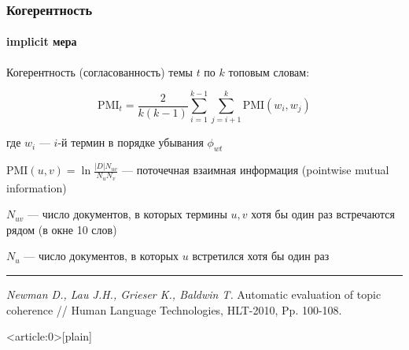 \documentclass[fullscreen=true, bookmarks=true, hyperref={pdfencoding=unicode}]{beamer}
\begin{document}
\begin{frame}
  \frametitle{Когерентность}
  \framesubtitle{implicit мера}

  Когерентность (согласованность) темы $t$ по $k$ топовым словам:

  $$ \text{PMI}_t = \frac{2}{k(k-1)} \sum\limits_{i=1}^{k-1} \sum\limits_{j=i+1}^{k} \text{PMI}(w_i, w_j) $$

  где $w_i$ — $i$-й термин в порядке убывания $\phi_{wt}$

  \vspace{0.5cm}
  $\text{PMI}(u, v) = \ln \frac{|D|N_{uv}}{N_u N_v}$ — поточечная взаимная информация (pointwise mutual information)

  $N_{uv}$ — число документов, в которых термины $u, v$ хотя бы один раз встречаются рядом (в окне 10 слов)

  $N_{u}$ — число документов, в которых $u$ встретился хотя бы один раз

  \noindent\rule{8cm}{0.4pt}

  {\footnotesize
  {\it Newman D., Lau J.H., Grieser K., Baldwin T.} Automatic evaluation of topic coherence // Human Language Technologies, HLT-2010, Pp. 100-108.}
\end{frame}


{ %
    \begin{frame}<article:0>[plain]
     \end{frame}
}
\end{document}
